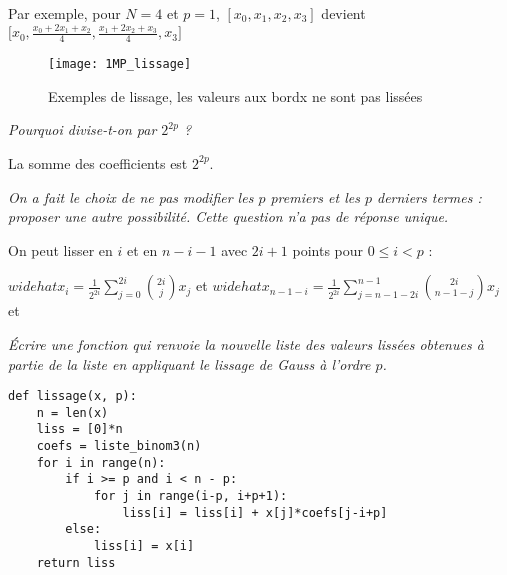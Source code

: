 Par exemple, pour $N=4$ et $p = 1$, $[x_0,x_1,x_2,x_3]$ devient
$\bigl[x_0,\frac{x_0+2x_1+x_2}4,\frac{x_1+2x_2+x_3}4,x_3\bigr]$
\begin{figure}[ht]
\begin{center}
\texttt{[image: 1MP\_lissage]}
\caption{Exemples de lissage, les valeurs aux bordx ne sont pas lissées}
\end{center}
\end{figure}
\begin{Exercise}  
\it Pourquoi divise-t-on par $2^{2p}$ ?
\end{Exercise}
\begin{Answer}
La somme des coefficients est $2^{2p}$.
\end{Answer}
\begin{Exercise}
\it On a fait le choix de ne pas modifier les $p$ premiers et les $p$ derniers termes : proposer une autre possibilité. Cette question n'a pas de réponse unique.
\end{Exercise}
\begin{Answer}On peut lisser en $i$ et en $n-i-1$ avec $2i+1$ points pour $0\le i < p$ :

$\displaystyle widehat x_i = \frac 1{2^{2i}}\sum_{j=0}^{2i}\binom {2i}{j} x_{j}$ et
$\displaystyle widehat x_{n-1-i} = \frac 1{2^{2i}}\sum_{j=n-1-2i}^{n-1}\binom {2i}{n-1-j} x_{j}$ et
\end{Answer}
\begin{Exercise}
\it Écrire une fonction  qui renvoie la nouvelle liste des valeurs lissées obtenues à partie de la liste  en appliquant le lissage de Gauss à l'ordre $p$.
\end{Exercise}
\begin{Answer}
\begin{lstlisting}
def lissage(x, p):
    n = len(x)
    liss = [0]*n
    coefs = liste_binom3(n)
    for i in range(n):
        if i >= p and i < n - p:
            for j in range(i-p, i+p+1):
                liss[i] = liss[i] + x[j]*coefs[j-i+p]
        else:
            liss[i] = x[i]
    return liss
\end{lstlisting}
\end{Answer}
